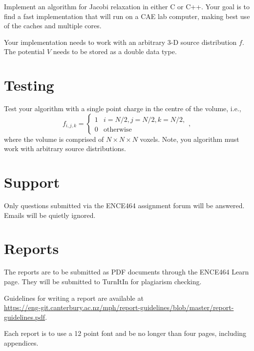\documentclass[a4paper,11pt]{article}
\begin{document}
Implement an algorithm for Jacobi relaxation in either C or C++.  Your
goal is to find a fast implementation that will run on a CAE lab
computer, making best use of the caches and multiple cores.

Your implementation needs to work with an arbitrary 3-D source
distribution $f$.  The potential $V$ needs to be stored as a double
data type.



\section{Testing}

Test your algorithm with a single point charge in the centre of the
volume, i.e.,
%
\begin{equation}
  f_{i,j,k} = \left\{
  \begin{array}{ll}
    1 & i=N/2, j=N/2, k=N/2, \\
    0 & \mbox{otherwise}
  \end{array}\right.,
\end{equation}
%
where the volume is comprised of $N \times N \times N$ voxels.  Note,
you algorithm must work with arbitrary source distributions.




\section{Support}

Only questions submitted via the ENCE464 assignment forum will be
answered.  Emails will be quietly ignored.


\section{Reports}

The reports are to be submitted as PDF documents through the ENCE464
Learn page.  They will be submitted to TurnItIn for plagiarism
checking.

Guidelines for writing a report are available at\\
\url{https://eng-git.canterbury.ac.nz/mph/report-guidelines/blob/master/report-guidelines.pdf}.

Each report is to use a 12 point font and be no longer than four
pages, including appendices.
\end{document}
